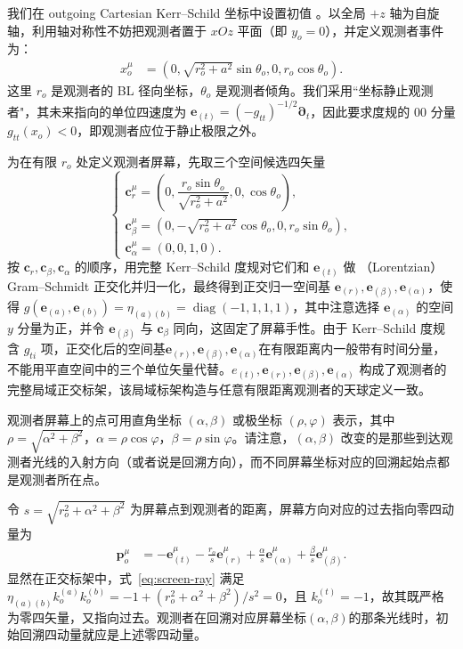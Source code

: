 \documentclass[UTF8,11pt,a4paper,fontset=fandol]{ctexart}
\newcommand{\er}{\bm{e}_{(r)}}
\newcommand{\ealpha}{\bm{e}_{(\alpha)}}
\newcommand{\ebeta}{\bm{e}_{(\beta)}}
\newcommand{\et}{\bm{e}_{(t)}}
\begin{document}
我们在 outgoing Cartesian Kerr--Schild 坐标中设置初值 。以全局 \(+z\) 轴为自旋轴，利用轴对称性不妨把观测者置于 \(xOz\) 平面（即 \(y_o=0\)），并定义观测者事件为：
\begin{align}
 x_o^\mu&=\left(0,\sqrt{r_o^2+a^2}\sin\theta_o,0,r_o\cos\theta_o\right). \label{eq:kerr-observer-event}
\end{align}
这里 \(r_o\) 是观测者的 BL 径向坐标，\(\theta_o\) 是观测者倾角。我们采用“坐标静止观测者"，其未来指向的单位四速度为 \(\et=(-g_{tt})^{-1/2}\bm{\partial}_t\)，因此要求度规的 00 分量 \(g_{tt}(x_o)<0\)，即观测者应位于静止极限之外。

为在有限 \(r_o\) 处定义观测者屏幕，先取三个空间候选四矢量
\begin{equation}
\begin{cases}
 \bm{c}_r^\mu=\left(0,\dfrac{r_o\sin\theta_o}{\sqrt{r_o^2+a^2}},0,\cos\theta_o\right),\\[6pt]
 \bm{c}_\beta^\mu=\left(0,-\sqrt{r_o^2+a^2}\cos\theta_o,0,r_o\sin\theta_o\right), \nonumber\\[6pt]
 \bm{c}_\alpha^\mu=(0,0,1,0). \label{eq:kerr-screen-candidates}
\end{cases}
\end{equation}
按 \(\bm{c}_r,\bm{c}_\beta,\bm{c}_\alpha\) 的顺序，用完整 Kerr--Schild 度规对它们和 \(\et\) 做 （Lorentzian） Gram--Schmidt 正交化并归一化，最终得到正交归一空间基 \(\er,\ebeta,\ealpha\)，使得 \(g(\bm{e}_{(a)},\bm{e}_{(b)})=\eta_{(a)(b)}=\operatorname{diag}(-1,1,1,1)\)，其中注意选择 \(\ealpha\) 的空间 \(y\) 分量为正，并令 \(\ebeta\) 与 \(\bm{c}_\beta\) 同向，这固定了屏幕手性。由于 Kerr--Schild 度规含 \(g_{ti}\) 项，正交化后的空间基\(\er,\ebeta,\ealpha\)在有限距离内一般带有时间分量，不能用平直空间中的三个单位矢量代替。\(e_{(t)},\er,\ebeta,\ealpha\) 构成了观测者的完整局域正交标架，该局域标架构造与任意有限距离观测者的天球定义一致\cite{Grenzebach2014,PerlickTsupko2022}。

观测者屏幕上的点可用直角坐标 \((\alpha,\beta)\) 或极坐标 \((\rho,\varphi)\) 表示，其中 \(\rho=\sqrt{\alpha^2+\beta^2}\)，\(\alpha=\rho\cos\varphi\)，\(\beta=\rho\sin\varphi\)。请注意，\((\alpha,\beta)\) 改变的是那些到达观测者光线的入射方向（或者说是回溯方向），而不同屏幕坐标对应的回溯起始点都是观测者所在点。
  
令 \(s=\sqrt{r_o^2+\alpha^2+\beta^2}\) 为屏幕点到观测者的距离，屏幕方向对应的过去指向零四动量为
\begin{align}
 \bm{p}_o^\mu&=-\et^\mu-\frac{r_o}{s}\er^\mu
 +\frac{\alpha}{s}\ealpha^\mu+\frac{\beta}{s}\ebeta^\mu. \label{eq:screen-ray}
\end{align}
显然在正交标架中，式~\eqref{eq:screen-ray} 满足 \(\eta_{(a)(b)}k_o^{(a)}k_o^{(b)}=-1+(r_o^2+\alpha^2+\beta^2)/s^2=0\)，且 \(k_o^{(t)}=-1\)，故其既严格为零四矢量，又指向过去。观测者在回溯对应屏幕坐标$(\alpha,\beta)$的那条光线时，初始回溯四动量就应是上述零四动量。
\end{document}
